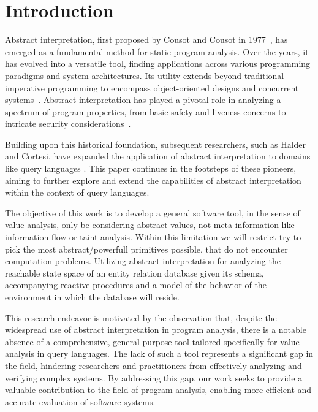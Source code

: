 
\section{Introduction}\label{sec:introduction}
Abstract interpretation, first proposed by Cousot and Cousot in 1977~\cite{cousot_abstract_1977}, has emerged as a fundamental method for static program analysis.
Over the years, it has evolved into a versatile tool, finding applications across various programming paradigms and system architectures.
Its utility extends beyond traditional imperative programming to encompass object-oriented designs and concurrent systems~\cite{gustafsson_analyzing_2013, mine_static_2023}.
Abstract interpretation has played a pivotal role in analyzing a spectrum of program properties, from basic safety and liveness concerns to intricate security considerations~\cite{mastroeni_abstract_2011}.


Building upon this historical foundation, subsequent researchers, such as Halder and Cortesi, have expanded the application of abstract interpretation to domains like query languages \cite{halder_abstract_2012}.
This paper continues in the footsteps of these pioneers, aiming to further explore and extend the capabilities of abstract interpretation within the context of query languages.

The objective of this work is to develop a general software tool, in the sense of value analysis, only be considering abstract values, not meta information like information flow or taint analysis.
Within this limitation we will restrict try to pick the most abstract/powerfull primitives possible, that do not encounter computation problems.
Utilizing abstract interpretation for analyzing the reachable state space of an entity relation database given its schema, accompanying reactive procedures and a model of the behavior of the environment in which the database will reside.



This research endeavor is motivated by the observation that, despite the widespread use of abstract interpretation in program analysis, there is a notable absence of a comprehensive, general-purpose tool tailored specifically for value analysis in query languages.
The lack of such a tool represents a significant gap in the field, hindering researchers and practitioners from effectively analyzing and verifying complex systems.
By addressing this gap, our work seeks to provide a valuable contribution to the field of program analysis, enabling more efficient and accurate evaluation of software systems.
